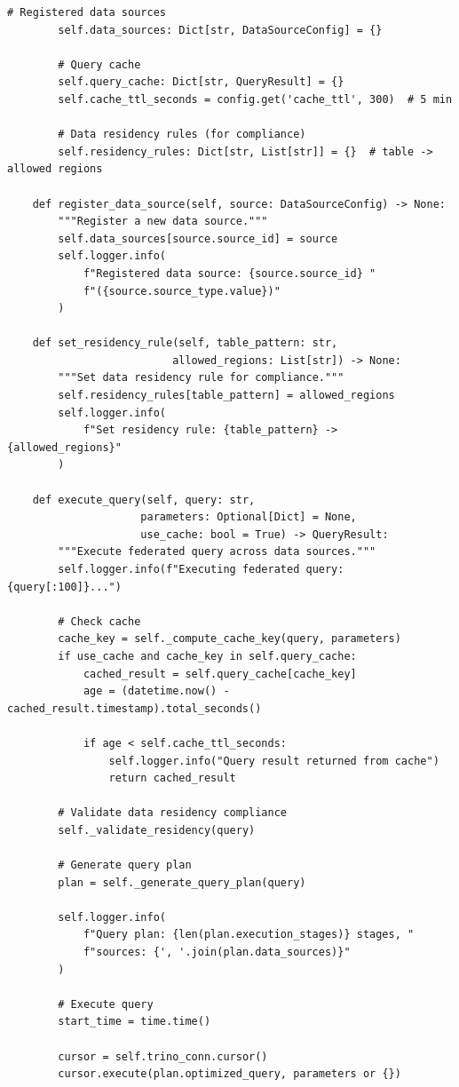 \begin{lstlisting}[style=python, caption=DataVirtualizer with Federated Queries]
        # Registered data sources
        self.data_sources: Dict[str, DataSourceConfig] = {}

        # Query cache
        self.query_cache: Dict[str, QueryResult] = {}
        self.cache_ttl_seconds = config.get('cache_ttl', 300)  # 5 min

        # Data residency rules (for compliance)
        self.residency_rules: Dict[str, List[str]] = {}  # table -> allowed regions

    def register_data_source(self, source: DataSourceConfig) -> None:
        """Register a new data source."""
        self.data_sources[source.source_id] = source
        self.logger.info(
            f"Registered data source: {source.source_id} "
            f"({source.source_type.value})"
        )

    def set_residency_rule(self, table_pattern: str,
                          allowed_regions: List[str]) -> None:
        """Set data residency rule for compliance."""
        self.residency_rules[table_pattern] = allowed_regions
        self.logger.info(
            f"Set residency rule: {table_pattern} -> {allowed_regions}"
        )

    def execute_query(self, query: str,
                     parameters: Optional[Dict] = None,
                     use_cache: bool = True) -> QueryResult:
        """Execute federated query across data sources."""
        self.logger.info(f"Executing federated query: {query[:100]}...")

        # Check cache
        cache_key = self._compute_cache_key(query, parameters)
        if use_cache and cache_key in self.query_cache:
            cached_result = self.query_cache[cache_key]
            age = (datetime.now() - cached_result.timestamp).total_seconds()

            if age < self.cache_ttl_seconds:
                self.logger.info("Query result returned from cache")
                return cached_result

        # Validate data residency compliance
        self._validate_residency(query)

        # Generate query plan
        plan = self._generate_query_plan(query)

        self.logger.info(
            f"Query plan: {len(plan.execution_stages)} stages, "
            f"sources: {', '.join(plan.data_sources)}"
        )

        # Execute query
        start_time = time.time()

        cursor = self.trino_conn.cursor()
        cursor.execute(plan.optimized_query, parameters or {})


\end{lstlisting}
